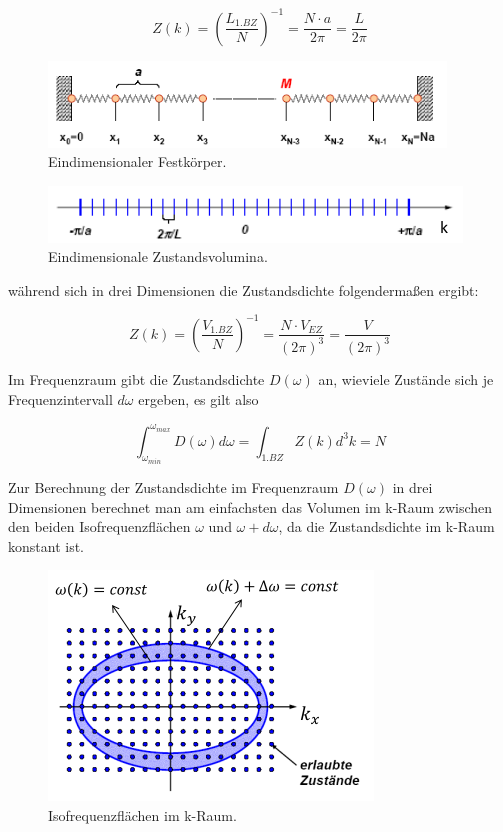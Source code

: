 \begin{equation}
    Z(k) = \left( \frac{L_{1.BZ}}{N} \right)^{-1} = \frac{N \cdot a}{2 \pi} = \frac{L}{2 \pi}
\end{equation}

\begin{figure}[H]
    \centering
    \includegraphics[width=.75\textwidth]{resources/31-10-2013/real.png}
    \caption{Eindimensionaler Festkörper.}
    \label{fig:q88:real}
\end{figure}

\begin{figure}[H]
    \centering
    \includegraphics[width=.75\textwidth]{resources/31-10-2013/k.png}
    \caption{Eindimensionale Zustandsvolumina.}
    \label{fig:q88:k}
\end{figure}

während sich in drei Dimensionen die Zustandsdichte folgendermaßen ergibt:

\begin{equation}
    Z(k) = \left( \frac{V_{1.BZ}}{N} \right)^{-1} = \frac{N \cdot V_{EZ}}{(2 \pi)^3} = \frac{V}{(2 \pi)^3}
\end{equation}

Im Frequenzraum gibt die Zustandsdichte $D(\omega)$ an, wieviele Zustände sich je Frequenzintervall $d \omega$ ergeben, es gilt also

\begin{equation}
    \int_{\omega_{min}}^{\omega_{max}} D(\omega) d \omega = \int_{1.BZ} Z(k) d^3 k = N
\end{equation}

Zur Berechnung der Zustandsdichte im Frequenzraum $D(\omega)$ in drei Dimensionen berechnet man am einfachsten das Volumen im k-Raum zwischen den beiden Isofrequenzflächen $\omega$ und $\omega + d \omega$, da die Zustandsdichte im k-Raum konstant ist.

\begin{figure}[H]
    \centering
    \includegraphics[width=.75\textwidth]{resources/31-10-2013/dw.png}
    \caption{Isofrequenzflächen im k-Raum.}
    \label{fig:q88:dw}
\end{figure}

